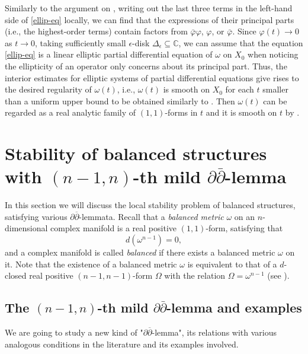 \documentclass[12pt]{amsart}
\numberwithin{equation}{section}
\renewcommand{\1}{\mathds{1}}
\newcommand{\db}{\overline{\partial}}
\newcommand{\om}{\omega}
\renewcommand{\>}{\rightarrow}
\newcommand{\p}{\partial}
\def\p{\partial}
\def\b{\bar}
\def\om{\omega}
\begin{document}
Similarly to the argument on \cite[Page 281]{k}, writing out the
last three terms in the left-hand side of \eqref{ellip-eq} locally,
we can find that the expressions of their principal parts (i.e., the
highest-order terms) contain factors from $\b{\varphi}\varphi$,
$\varphi$, or $\b{\varphi}$. Since $\varphi(t)\rightarrow 0$ as
$t\rightarrow 0$, taking sufficiently small $\epsilon$-disk
$\Delta_{\epsilon}\subseteq \mathbb{C}$, we can assume that the equation
\eqref{ellip-eq} is a linear elliptic partial differential equation
of $\om$ on $X_0$ when noticing the ellipticity of an operator only
concerns about its principal part. Thus, the interior estimates \cite{dn} for
elliptic systems of partial differential equations give
rises to the desired regularity of $\omega(t)$, i.e., $\omega(t)$ is
smooth on $X_0$ for each $t$ smaller than a uniform upper bound to
be obtained similarly to \cite[Appendix.\S 8]{k}. Then $\omega(t)$ can
be regarded as a real analytic family of $(1,1)$-forms in $t$ and it is smooth on $t$
by \cite[Proposition 2.2.3]{kp}.





\section{Stability of balanced structures with $(n-1,n)$-th mild
$\p\b{\p}$-lemma}\label{balanced}

In this section we will discuss the local stability problem of
balanced structures, satisfying various $\p\db$-lemmata. Recall that
a \emph{balanced metric} $\omega$ on an $n$-dimensional complex
manifold is a real positive $(1,1)$-form, satisfying that
$$d(\omega^{n-1})=0,$$
and a complex manifold is called \emph{balanced} if there
exists a balanced metric $\omega$ on it. Note that the existence of
a balanced metric $\omega$ is equivalent to that of a $d$-closed real
positive $(n-1,n-1)$-form $\Omega$ with the relation
$\Omega=\omega^{n-1}$ (see \cite[(4.8)]{Mich}).

\subsection{The $(n-1,n)$-th mild $\p\b{\p}$-lemma and
examples}\label{subs-mild} We are going to study a new kind of
"$\p\db$-lemma", its relations with various analogous conditions in
the literature and its examples involved.
\end{document}
